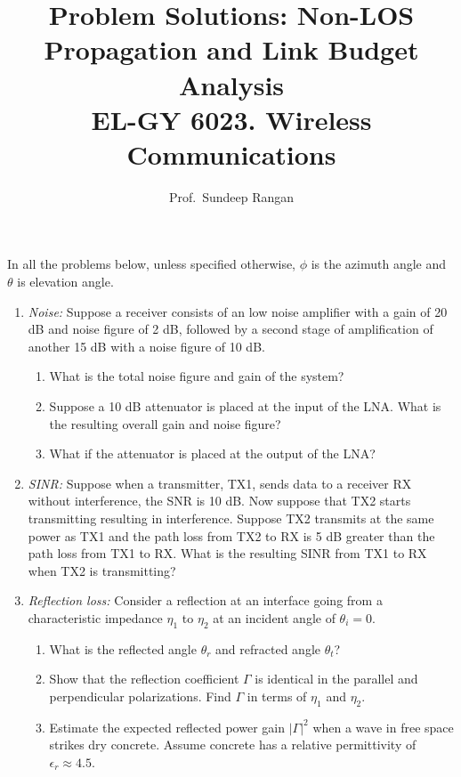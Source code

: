 \documentclass[11pt]{article}
\begin{document}
\title{Problem Solutions:  Non-LOS Propagation and Link Budget Analysis\\
EL-GY 6023. Wireless Communications}
\author{Prof.\ Sundeep Rangan}
\date{}

\maketitle

In all the problems below, unless specified otherwise, $\phi$ is the
azimuth angle and $\theta$ is elevation angle.

\begin{enumerate}

\item \emph{Noise:}
Suppose a receiver consists of an low noise amplifier with a gain of 20 dB
and noise figure of 2 dB, followed by a second stage of amplification of
another 15 dB with a noise figure of 10 dB.
\begin{enumerate}[label=(\alph*)]
\item What is the total noise figure and gain of the system?
\item Suppose a 10 dB attenuator is placed at the input of the LNA.
What is the resulting overall gain and noise figure?
\item What if the attenuator is placed at the output of the LNA?
\end{enumerate}


\item \emph{SINR:}
Suppose when a transmitter, TX1, sends data to a receiver RX
without interference, the SNR is 10 dB.  Now suppose that TX2
starts transmitting resulting in interference.
Suppose TX2 transmits at the same power as TX1 and the path loss from
TX2 to RX is 5 dB greater than the path loss from TX1 to RX.
What is the resulting SINR from TX1 to RX when TX2 is transmitting?

\item \emph{Reflection loss:}  Consider a reflection at an 
interface going from a characteristic impedance $\eta_1$ to $\eta_2$ at 
an incident angle of $\theta_i = 0$.
\begin{enumerate}[label=(\alph*)]
\item What is the reflected angle $\theta_r$ and refracted 
angle $\theta_t$?
\item Show that the reflection coefficient $\Gamma$ is 
identical in the parallel and perpendicular polarizations.
Find $\Gamma$ in terms of $\eta_1$ and $\eta_2$.
\item Estimate the expected reflected power gain $|\Gamma|^2$ 
when a wave in free space strikes dry concrete.  
Assume concrete has a relative permittivity  of $\epsilon_r \approx 4.5$.
\end{enumerate}




\end{enumerate}
\end{document}
